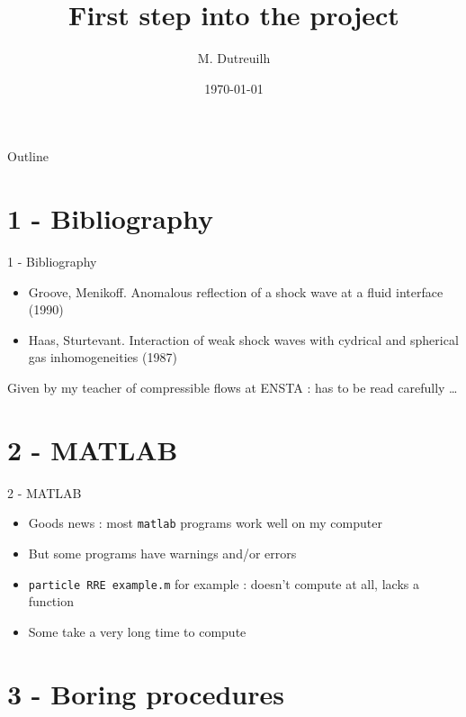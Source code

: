 \documentclass{beamer}
\title[Shock wave refraction]{First step into the project}
\author{M. Dutreuilh}
\institute{Tsinghua University}
\date{\today}
\begin{document}
\begin{frame}
  \titlepage
\end{frame}

\begin{frame}{Outline}
  \tableofcontents
\end{frame}

\section{1 - Bibliography}

\begin{frame}{1 - Bibliography}

\begin{itemize}
  \item Groove, Menikoff. Anomalous reflection of a shock wave at a fluid interface (1990)
  \item Haas, Sturtevant. Interaction of weak shock waves with cydrical and spherical gas inhomogeneities (1987)
\end{itemize}

Given by my teacher of compressible flows at ENSTA : has to be read carefully \dots{}

\end{frame}

\section{2 - MATLAB}
\begin{frame}{2 - MATLAB}
\begin{itemize}
\item Goods news : most \texttt{matlab} programs work well on my computer


\item But some programs have warnings and/or errors

\item \texttt{particle RRE example.m} for example : doesn't compute at all, lacks a function
\item Some take a very long time to compute
\end{itemize}


\end{frame}

\section{3 - Boring procedures}
\end{document}
